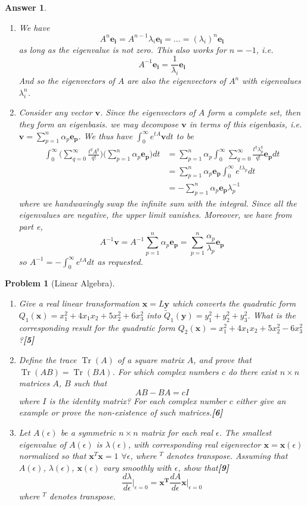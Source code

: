 \documentclass[a4paper]{article}
\DeclareMathOperator{\Tr}{Tr}
\newtheorem{ans}{Answer}[section]
\theoremstyle{new}
\newtheorem{qns}{Problem}[section]
\begin{document}
\begin{ans}
\begin{enumerate}[label=(\alph*)]
\item We have 
$$A^n\mathbf{e_i}=A^{n-1}\lambda_i\mathbf{e_i}=\dots=(\lambda_i)^n\mathbf{e_i}$$
as long as the eigenvalue is not zero. This also works for $n=-1$, i.e.
$$A^{-1}\mathbf{e_i}=\frac{1}{\lambda_i}\mathbf{e_i}$$
And so the eigenvectors of $A$ are also the eigenvectors of $A^n$ with eigenvalues $\lambda_i^n$.
\item Consider any vector $\mathbf{v}$. Since the eigenvectors of $A$ form a complete set, then they form an eigenbasis. we may decompose $\mathbf{v}$ in terms of this eigenbasis, i.e. $\mathbf{v}=\sum_{p=1}^n\alpha_p\mathbf{e_p}$. We thus have $\int_0^\infty e^{tA}\mathbf{v}dt$ to be
\begin{align}
\int_0^\infty\bigg(\sum_{q=0}^\infty\frac{t^qA^q}{q!}\bigg)\bigg(\sum_{p=1}^n\alpha_p\mathbf{e_p}\bigg)dt&=\sum_{p=1}^n\alpha_p\int_0^\infty\sum_{q=0}^\infty\frac{t^q\lambda_p^q}{q!}\mathbf{e_p}dt\nonumber\\&=\sum_{p=1}^n\alpha_p\mathbf{e_p}\int_0^\infty e^{t\lambda_p}dt\nonumber\\&=-\sum_{p=1}^n\alpha_p\mathbf{e_p}\lambda_p^{-1}\nonumber
\end{align}
where we handwavingly swap the infinite sum with the integral. 
Since all the eigenvalues are negative, the upper limit vanishes. Moreover, we have from part e, $$A^{-1}\mathbf{v}=A^{-1}\sum_{p=1}^n\alpha_p\mathbf{e_p}=\sum_{p=1}^n\frac{\alpha_p}{\lambda_p}\mathbf{e_p}$$
so $A^{-1}=-\int_0^\infty e^{tA}dt$ as requested.
\end{enumerate}
\end{ans}
\begin{qns}[Linear Algebra]\leavevmode
\begin{enumerate}[label=(\alph*)]
    \item Give a real linear transformation $\mathbf{x}=L\mathbf{y}$ which converts the quadratic form $Q_1(\mathbf{x})=x_1^2+4x_1x_2+5x_2^2+6x_3^2$ into $\tilde{Q}_1(\mathbf{y})=y_1^2+y_2^2+y_3^2$. What is the corresponding result for the quadratic form $Q_2(\mathbf{x})=x_1^2+4x_1x_2+5x_2^2-6x_3^2$?\hfill \textbf{[5]}
    \item Define the trace $\Tr(A)$ of a square matrix $A$, and prove that $\Tr(AB)=\Tr(BA)$. For which complex numbers $c$ do there exist $n\times n$ matrices $A$, $B$ such that
$$AB-BA=cI$$
where $I$ is the identity matrix? For each complex number $c$ either give an example or prove the non-existence of such matrices.\hfill \textbf{[6]}
\item Let $A(\epsilon)$ be a symmetric $n\times n$ matrix for each real $\epsilon$. The smallest eigenvalue of $A(\epsilon)$ is $\lambda(\epsilon)$, with corresponding real eigenvector $\mathbf{x}=\mathbf{x}(\epsilon)$ normalized so that $\mathbf{x}^T\mathbf{x}=1$ $\forall\epsilon$, where $^T$ denotes transpose. Assuming that $A(\epsilon)$, $\lambda(\epsilon)$, $\mathbf{x}(\epsilon)$ vary smoothly with $\epsilon$, show that\hfill \textbf{[9]}
$$\frac{d\lambda}{d\epsilon}\bigg|_{\epsilon=0}=\mathbf{x^T}\frac{dA}{d\epsilon}\mathbf{x}\bigg|_{\epsilon=0}$$
where $^T$ denotes transpose.
\end{enumerate}
\end{qns}
\end{document}
